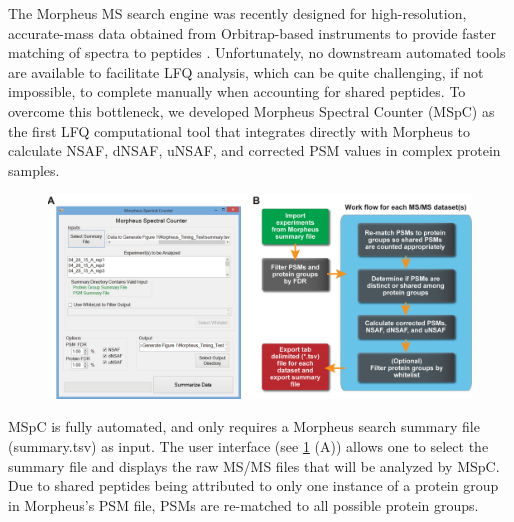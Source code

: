 The Morpheus MS search engine was recently designed for high-resolution, accurate-mass data obtained from Orbitrap-based instruments to provide faster matching of spectra to peptides \citep{wenger13}.
Unfortunately, no downstream automated tools are available to facilitate LFQ analysis, which can be quite challenging, if not impossible, to complete manually when accounting for shared peptides.
To overcome this bottleneck, we developed Morpheus Spectral Counter (MSpC) as the first LFQ computational tool that integrates directly with Morpheus to calculate NSAF, dNSAF, uNSAF, and corrected PSM \citep{fermin11} values in complex protein samples.
\begin{figure}
	\centering
	\includegraphics[width=\columnwidth]{MSpC/figure1_supplemental.png}
	\label{fig:GUIflow}
\end{figure}
MSpC is fully automated, and only requires a Morpheus search summary file (summary.tsv) as input.
The user interface (see \ref{fig:GUIflow} (A)) allows one to select the summary file and displays the raw MS/MS files that will be analyzed by MSpC.
Due to shared peptides being attributed to only one instance of a protein group in Morpheus's PSM file, PSMs are re-matched to all possible protein groups.
